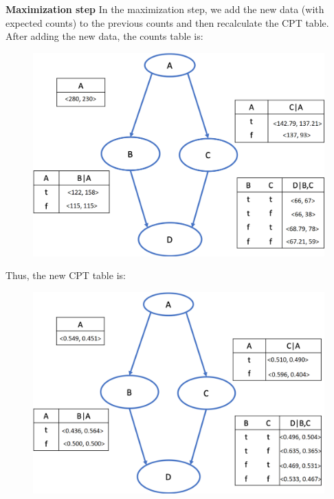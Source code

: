 \documentclass{article}
\newenvironment{soln}{
	\leavevmode\color{blue}\ignorespaces
}{}
\begin{document}
\begin{enumerate}
\begin{enumerate}
\begin{soln}
\textbf{Maximization step}
In the maximization step, we add the new data (with expected counts) to the previous counts and then recalculate the CPT table.
After adding the new data, the counts table is:
\begin{figure}[h]
\centering
\includegraphics[scale=0.50]{figs/p2_ans2}
\label{fig:q2_ans2}
\end{figure}

\pagebreak
Thus, the new CPT table is:
\begin{figure}[h]
\centering
\includegraphics[scale=0.50]{figs/p2_ans3}
\label{fig:q2_ans3}
\end{figure}

\end{soln}



\end{enumerate}
\end{enumerate}
\end{document}
